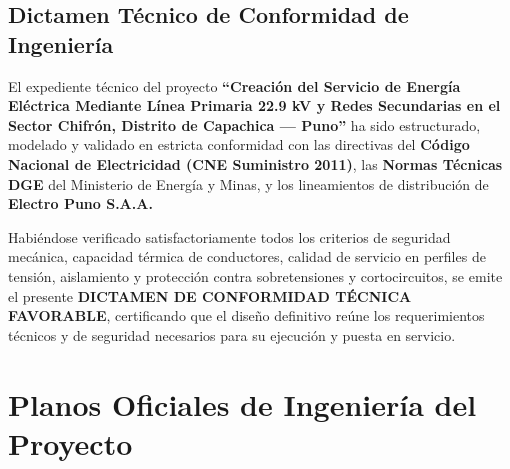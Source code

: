 \documentclass[12pt,a4paper]{report}
\begin{document}
\section{Dictamen Técnico de Conformidad de Ingeniería}
El expediente técnico del proyecto \textbf{``Creación del Servicio de Energía Eléctrica Mediante Línea Primaria 22.9 kV y Redes Secundarias en el Sector Chifrón, Distrito de Capachica --- Puno''} ha sido estructurado, modelado y validado en estricta conformidad con las directivas del \textbf{Código Nacional de Electricidad (CNE Suministro 2011)}, las \textbf{Normas Técnicas DGE} del Ministerio de Energía y Minas, y los lineamientos de distribución de \textbf{Electro Puno S.A.A.}

Habiéndose verificado satisfactoriamente todos los criterios de seguridad mecánica, capacidad térmica de conductores, calidad de servicio en perfiles de tensión, aislamiento y protección contra sobretensiones y cortocircuitos, se emite el presente \textbf{DICTAMEN DE CONFORMIDAD TÉCNICA FAVORABLE}, certificando que el diseño definitivo reúne los requerimientos técnicos y de seguridad necesarios para su ejecución y puesta en servicio.

\chapter{Planos Oficiales de Ingeniería del Proyecto}
\end{document}
